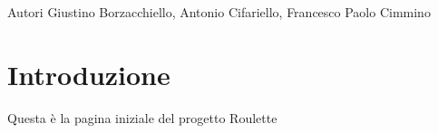 \begin{DoxyAuthor}{Autori}
Giustino Borzacchiello, Antonio Cifariello, Francesco Paolo Cimmino
\end{DoxyAuthor}
\hypertarget{index_intro}{}\section{Introduzione}\label{index_intro}
Questa è la pagina iniziale del progetto Roulette 